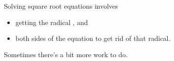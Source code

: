 
\begin{tcolorbox}[center,width=5.75in,]
    Solving square root equations involves 
    \begin{itemize}
        \item getting the radical  , and 
        \item {} both sides of the equation to get rid of that radical.
    \end{itemize}
    Sometimes there's a bit more work to do.
\end{tcolorbox}